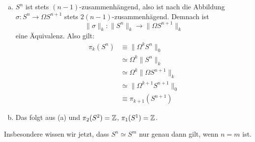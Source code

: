\begin{beweis}
  \begin{enumerate}[(a)]
  \item \(S^n\) ist stets \((n-1)\)-zusammenhängend, also ist nach  die Abbildung
    \(\sigma:S^n\to \Omega S^{n+1}\) stets \(2(n-1)\)-zusammenhägend.
    Demnach ist
    \[
      \|\sigma\|_k:\|S^n\|_k\to \|\Omega S^{n+1}\|_k
    \]
    eine Äquivalenz.
    Also gilt:
    \begin{align*}
      \pi_k(S^n)&\equiv \|\Omega^k S^n\|_0 \\
                &\simeq \Omega^k\|S^n\|_k \\
                &\simeq \Omega^k\|\Omega S^{n+1}\|_k \\
                &\simeq \|\Omega^{k+1}S^{n+1}\|_0 \\
                &\equiv \pi_{k+1}(S^{n+1})
    \end{align*}
  \item Das folgt aus (a) und \(\pi_2(S^2)=\mathbb{Z}\), \(\pi_1(S^1)=\mathbb{Z}\).
  \end{enumerate}
\end{beweis}

Insbesondere wissen wir jetzt, dass \(S^n\simeq S^m\) nur genau dann gilt, wenn \(n=m\) ist.



